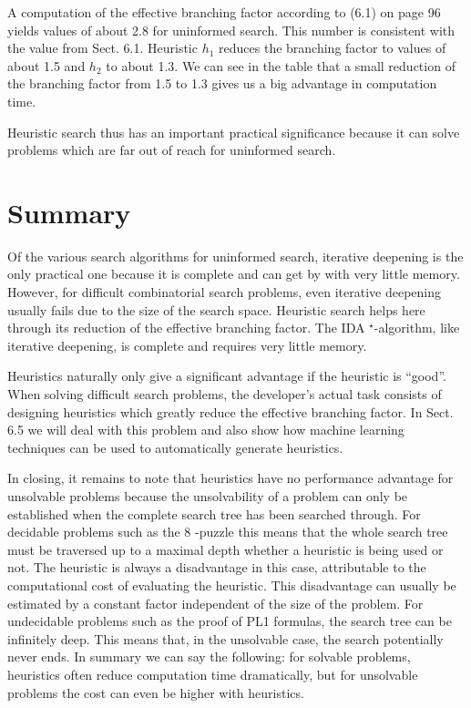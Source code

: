 \documentclass[10pt]{book}
\begin{document}
A computation of the effective branching factor according to (6.1) on page 96 yields values of about 2.8 for uninformed search. This number is consistent with the value from Sect. 6.1. Heuristic $h_{1}$ reduces the branching factor to values of about 1.5 and $h_{2}$ to about 1.3. We can see in the table that a small reduction of the branching factor from 1.5 to 1.3 gives us a big advantage in computation time.

Heuristic search thus has an important practical significance because it can solve problems which are far out of reach for uninformed search.

\section{Summary}
Of the various search algorithms for uninformed search, iterative deepening is the only practical one because it is complete and can get by with very little memory. However, for difficult combinatorial search problems, even iterative deepening usually fails due to the size of the search space. Heuristic search helps here through its reduction of the effective branching factor. The IDA ${ }^{\star}$-algorithm, like iterative deepening, is complete and requires very little memory.

Heuristics naturally only give a significant advantage if the heuristic is ``good''. When solving difficult search problems, the developer's actual task consists of designing heuristics which greatly reduce the effective branching factor. In Sect. 6.5 we will deal with this problem and also show how machine learning techniques can be used to automatically generate heuristics.

In closing, it remains to note that heuristics have no performance advantage for unsolvable problems because the unsolvability of a problem can only be established when the complete search tree has been searched through. For decidable problems such as the 8 -puzzle this means that the whole search tree must be traversed up to a maximal depth whether a heuristic is being used or not. The heuristic is always a disadvantage in this case, attributable to the computational cost of evaluating the heuristic. This disadvantage can usually be estimated by a constant factor independent of the size of the problem. For undecidable problems such as the proof of PL1 formulas, the search tree can be infinitely deep. This means that, in the unsolvable case, the search potentially never ends. In summary we can say the following: for solvable problems, heuristics often reduce computation time dramatically, but for unsolvable problems the cost can even be higher with heuristics.
\end{document}
